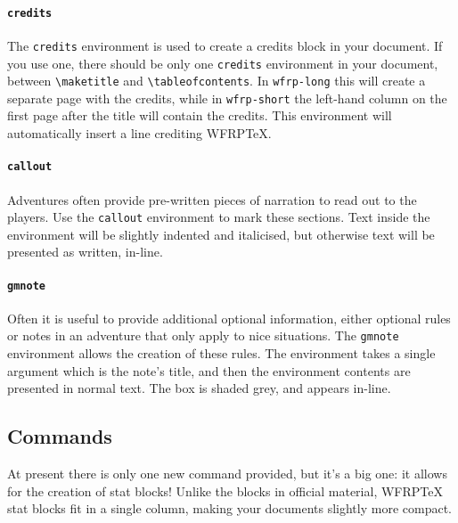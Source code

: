 \documentclass[10pt,a4paper]{article}
\begin{document}
\paragraph{\texttt{credits}} The \texttt{credits} environment is used to
create a credits block in your document. If you use one, there should be
only one \texttt{credits} environment in your document, between
\texttt{\textbackslash{}maketitle} and \texttt{\textbackslash{}tableofcontents}.
In \texttt{wfrp-long} this will create a separate page with the credits,
while in \texttt{wfrp-short} the left-hand column on the first page after
the title will contain the credits. This environment will automatically
insert a line crediting WFRP\TeX{}.

\paragraph{\texttt{callout}} Adventures often provide pre-written pieces of
narration to read out to the players. Use the \texttt{callout} environment
to mark these sections. Text inside the environment will be slightly indented
and italicised, but otherwise text will be presented as written, in-line.

\paragraph{\texttt{gmnote}} Often it is useful to provide additional optional
information, either optional rules or notes in an adventure that only apply
to nice situations. The \texttt{gmnote} environment allows the creation of
these rules. The environment takes a single argument which is the note's
title, and then the environment contents are presented in normal text. The
box is shaded grey, and appears in-line.

\subsection{Commands}
At present there is only one new command provided, but it's a big one: it
allows for the creation of stat blocks! Unlike the blocks in official material,
WFRP\TeX{} stat blocks fit in a single column, making your documents slightly
more compact.
\end{document}
